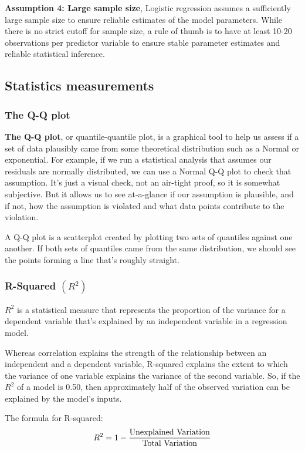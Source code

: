 \textbf{Assumption 4: Large sample size}, Logistic regression assumes a sufficiently large sample size to ensure reliable estimates of the model parameters. While there is no strict cutoff for sample size, a rule of thumb is to have at least 10-20 observations per predictor variable to ensure stable parameter estimates and reliable statistical inference.
\subsection{Statistics measurements}
\subsubsection{The Q-Q plot}
\noindent 

\textbf{The Q-Q plot}, or quantile-quantile plot, is a graphical tool to help us assess if a set of data plausibly came from some theoretical distribution such as a Normal or exponential. For example, if we run a statistical analysis that assumes our residuals are normally distributed, we can use a Normal Q-Q plot to check that assumption. It’s just a visual check, not an air-tight proof, so it is somewhat subjective. But it allows us to see at-a-glance if our assumption is plausible, and if not, how the assumption is violated and what data points contribute to the violation.

A Q-Q plot is a scatterplot created by plotting two sets of quantiles against one another. If both sets of quantiles came from the same distribution, we should see the points forming a line that’s roughly straight.
\subsubsection{R-Squared $(R^{2})$}
\noindent 

$R^2$ is a statistical measure that represents the proportion of the variance for a dependent variable that’s explained by an independent variable in a regression model.

Whereas correlation explains the strength of the relationship between an independent and a dependent variable, R-squared explains the extent to which the variance of one variable explains the variance of the second variable. So, if the $R^{2}$ of a model is 0.50, then approximately half of the observed variation can be explained by the model’s inputs.

The formula for R-squared:
$$
{R}^{2} = 1 - \frac{\textup{Unexplained Variation}}{\textup{Total Variation}}
$$

